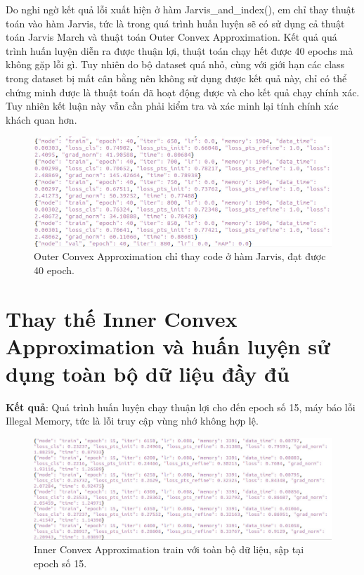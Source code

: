 \documentclass[12pt,a4paper,openany,oneside]{report}
\begin{document}
Do nghi ngờ kết quả lỗi xuất hiện ở hàm Jarvis\_and\_index(), em chỉ thay thuật toán vào hàm Jarvis, tức là trong quá trình huấn luyện sẽ có sử dụng cả thuật toán Jarvis March và thuật toán Outer Convex Approximation. Kết quả quá trình huấn luyện diễn ra được thuận lợi, thuật toán chạy hết được 40 epochs mà không gặp lỗi gì. Tuy nhiên do bộ dataset quá nhỏ, cùng với giới hạn các class trong dataset bị mất cân bằng nên không sử dụng được kết quả này, chỉ có thể chứng minh được là thuật toán đã hoạt động được và cho kết quả chạy chính xác. Tuy nhiên kết luận này vẫn cần phải kiểm tra và xác minh lại tính chính xác khách quan hơn.

\begin{figure}[ht!]
	\begin{center}
		\includegraphics[width=450px]{./outer_just_javis_smalldata_40epoch.JPG}
		\caption{Outer Convex Approximation chỉ thay code ở hàm Jarvis, đạt được 40 epoch.}
		\label{outer_just_javis_smalldata_40epoch}
	\end{center}
\end{figure} 
\section{Thay thế Inner Convex Approximation và huấn luyện sử dụng toàn bộ dữ liệu đầy đủ}

\textbf{Kết quả}: Quá trình huấn luyện chạy thuận lợi cho đến epoch số 15, máy báo lỗi Illegal Memory, tức là lỗi truy cập vùng nhớ không hợp lệ.

\begin{figure}[ht!]
	\begin{center}
		\includegraphics[width=450px]{./inner_fulldata_epoch15.JPG}
		\caption{Inner Convex Approximation train với toàn bộ dữ liệu, sập tại epoch số 15.}
		\label{inner_fulldata_epoch15}
	\end{center}
\end{figure} 
\end{document}
